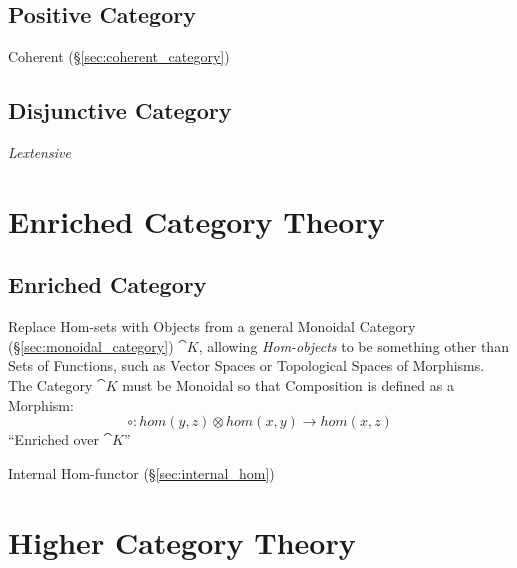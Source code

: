 \subsection{Positive Category}\label{sec:positive_category}

Coherent (\S\ref{sec:coherent_category})



\subsection{Disjunctive Category}\label{sec:disjunctive_category}

\emph{Lextensive}



\section{Enriched Category Theory}\label{sec:enriched_category_theory}

\subsection{Enriched Category}\label{sec:enriched_category}

Replace Hom-sets with Objects from a general Monoidal Category
(\S\ref{sec:monoidal_category}) $\cat{K}$, allowing \emph{Hom-objects}
to be something other than Sets of Functions, such as Vector Spaces or
Topological Spaces of Morphisms. The Category $\cat{K}$ must be
Monoidal so that Composition is defined as a Morphism:
\[
  \circ : hom(y,z) \otimes hom(x,y) \rightarrow hom(x,z)
\]
``Enriched over $\cat{K}$''

Internal Hom-functor (\S\ref{sec:internal_hom})



\section{Higher Category Theory}\label{sec:higher_category}

